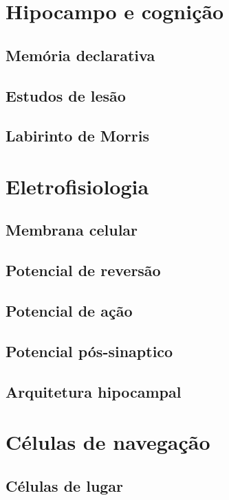 \section{Hipocampo e cognição}

\subsection{Memória declarativa}

\subsection{Estudos de lesão}

\subsection{Labirinto de Morris}

\section{Eletrofisiologia}

\subsection{Membrana celular}

\subsection{Potencial de reversão}

\subsection{Potencial de ação}

\subsection{Potencial pós-sinaptico}

\subsection{Arquitetura hipocampal}

\section{Células de navegação}

\subsection{Células de lugar}

